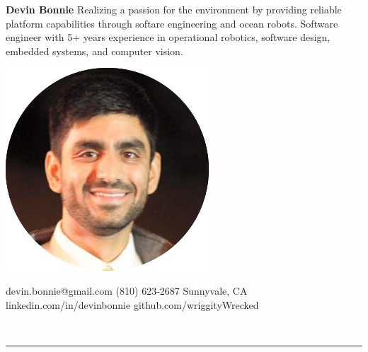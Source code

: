\documentclass{article}
\begin{document}
\renewcommand{\labelitemi}{\tiny$\bullet$}
{
%
\hspace{-12px}
\begin{minipage}[t]{0.33\textwidth}
\begin{flushleft}
\noindent
\textbf{\huge{Devin Bonnie}}
\vspace{10px}
\linebreak
\noindent
\small{Realizing a passion for the environment by providing reliable platform capabilities through softare engineering and ocean robots. Software engineer with 5+ years experience in operational robotics, software design, embedded systems, and computer vision.}
\vspace*{1\baselineskip}
\end{flushleft}
\end{minipage}
\begin{minipage}[c]{0.33\textwidth}
\begin{center}
\includegraphics[trim= 0cm 8cm 0 0cm,scale=0.33]{dbCircle}
\end{center}
\end{minipage}
\begin{minipage}[t]{0.33\textwidth}
\begin{flushright}
\vspace*{1\baselineskip}
devin.bonnie@gmail.com
 \vspace{1px}
\linebreak
(810) 623-2687
 \vspace{1px}
\linebreak
Sunnyvale, CA 
 \vspace{1px}
\linebreak
linkedin.com/in/devinbonnie
\linebreak
github.com/wriggityWrecked
\linebreak
\end{flushright}
\end{minipage}
%
\linebreak
\vspace{0px}\\
\rule{555px}{0.4pt}

}
\end{document}
